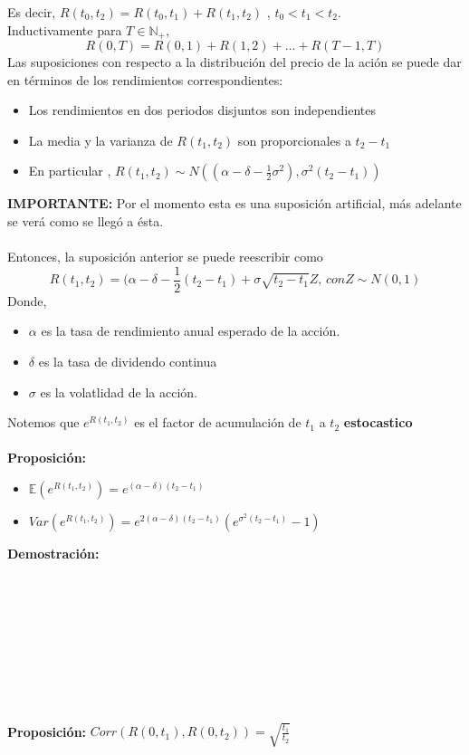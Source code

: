 \documentclass[12pts]{extarticle}
\begin{document}
Es decir, $R(t_0, t_2)=R(t_0, t_1) + R(t_1, t_2)$ ,  $t_0<t_1<t_2$.\\
Inductivamente para $T \in \mathbb{N_+}$, $$ R(0, T)=R(0,1)+R(1,2)+...+R(T-1,T)$$
Las suposiciones con respecto a la distribución del precio de la ación se puede dar en términos de los rendimientos correspondientes: 
\begin{itemize}
\item Los rendimientos en dos periodos disjuntos son independientes 
\item La media y la varianza de $R(t_1, t_2)$ son proporcionales a $t_2-t_1$
\item En particular , $R(t_1, t_2) \sim N((\alpha-\delta-\frac{1}{2}\sigma^2), \sigma^2 (t_2-t_1))$ 
\end{itemize}
\textbf{IMPORTANTE:}
Por el momento esta es una suposición artificial, más adelante se verá como se llegó a ésta. \\ \\
Entonces, la suposición anterior se puede reescribir como 
$$R(t_1, t_2)=( \alpha-\delta-\frac{1}{2}(t_2-t_1)+\sigma\sqrt{t_2-t_1}Z, \, con Z\sim N(0,1)$$
Donde, 
\begin{itemize}
\item $\alpha$ es la tasa de rendimiento anual esperado de la acción. 
\item $\delta$ es la tasa de dividendo continua 
\item $\sigma$ es la volatlidad de la acción. 
\end{itemize} 
Notemos que $e^{R(t_1, t_2)}$ es el factor de acumulación de $t_1$ a $t_2$ \textbf{estocastico}
\\ \\ 
\textbf{Proposición:}
\begin{itemize}
\item $\mathbb{E}(e^{R(t_1, t_2)})=e^{(\alpha - \delta)(t_2-t_1)}$
\item $Var(e^{R(t_1, t_2)})= e^{2( \alpha -\delta)(t_2 - t_1)} (e^{\sigma^2 (t_2 - t_1)} -1)$
\end{itemize}
\textbf{Demostración:} 
\\ \\ \\ \\ \\ \\ \\ \\ \\ \\ 
\textbf{Proposición:} $Corr(R(0, t_1), R(0, t_2))=\sqrt{\frac{t_1}{t_2}}$ \\
\end{document}
